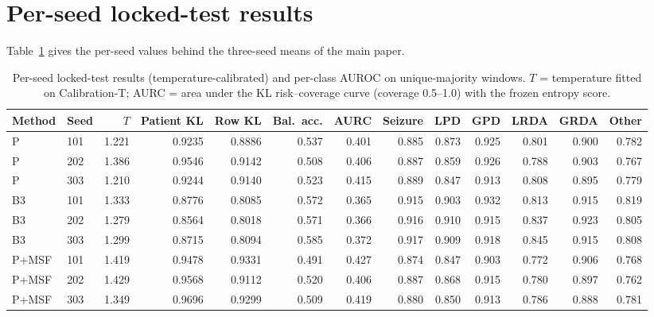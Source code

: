 \documentclass[manuscript,anonymous,nonacm]{acmart}
\begin{document}
\section{Per-seed locked-test results}
Table~\ref{tab:supseeds} gives the per-seed values behind the three-seed means of the main paper.
\begin{table}[htbp]
\caption{Per-seed locked-test results (temperature-calibrated) and per-class AUROC on unique-majority windows. $T$ = temperature fitted on Calibration-T; AURC = area under the KL risk--coverage curve (coverage 0.5--1.0) with the frozen entropy score.}
\label{tab:supseeds}
\small\setlength{\tabcolsep}{5pt}
\begin{tabular}{llrrrrrrrrrrr}
\toprule
Method & Seed & $T$ & Patient KL & Row KL & Bal.\ acc. & AURC & Seizure & LPD & GPD & LRDA & GRDA & Other \\
\midrule
P & 101 & 1.221 & 0.9235 & 0.8886 & 0.537 & 0.401 & 0.885 & 0.873 & 0.925 & 0.801 & 0.900 & 0.782 \\
P & 202 & 1.386 & 0.9546 & 0.9142 & 0.508 & 0.406 & 0.887 & 0.859 & 0.926 & 0.788 & 0.903 & 0.767 \\
P & 303 & 1.210 & 0.9244 & 0.9140 & 0.523 & 0.415 & 0.889 & 0.847 & 0.913 & 0.808 & 0.895 & 0.779 \\
B3 & 101 & 1.333 & 0.8776 & 0.8085 & 0.572 & 0.365 & 0.915 & 0.903 & 0.932 & 0.813 & 0.915 & 0.819 \\
B3 & 202 & 1.279 & 0.8564 & 0.8018 & 0.571 & 0.366 & 0.916 & 0.910 & 0.915 & 0.837 & 0.923 & 0.805 \\
B3 & 303 & 1.299 & 0.8715 & 0.8094 & 0.585 & 0.372 & 0.917 & 0.909 & 0.918 & 0.845 & 0.915 & 0.808 \\
P+MSF & 101 & 1.419 & 0.9478 & 0.9331 & 0.491 & 0.427 & 0.874 & 0.847 & 0.903 & 0.772 & 0.906 & 0.768 \\
P+MSF & 202 & 1.429 & 0.9568 & 0.9112 & 0.520 & 0.406 & 0.887 & 0.868 & 0.915 & 0.780 & 0.897 & 0.762 \\
P+MSF & 303 & 1.349 & 0.9696 & 0.9299 & 0.509 & 0.419 & 0.880 & 0.850 & 0.913 & 0.786 & 0.888 & 0.781 \\
\bottomrule
\end{tabular}
\end{table}
\end{document}
